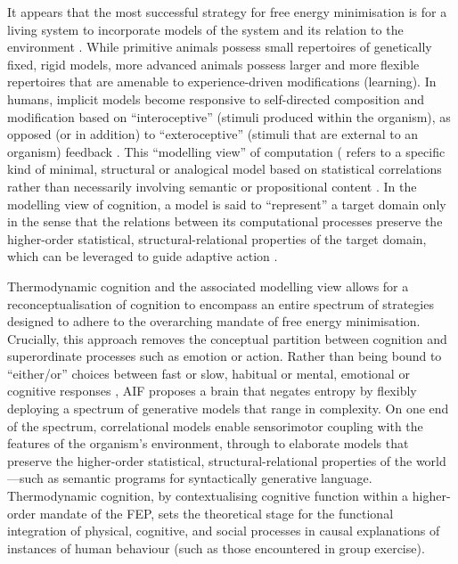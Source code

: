\begin{CJK}{UTF8}{gbsn}
It appears that the most successful strategy for free energy minimisation is for a living system to incorporate models of the system and its relation to the environment \citep{Conant1970}.  While primitive animals possess small repertoires of genetically fixed, rigid models, more advanced animals possess larger and more flexible repertoires that are amenable to experience-driven modifications (learning).  In humans, implicit models become responsive to self-directed composition and modification based on ``interoceptive'' (stimuli produced within the organism), as opposed (or in addition) to ``exteroceptive'' (stimuli that are external to an organism) feedback \citep{Yufik1998,FeldmanBarrett2015}.  This ``modelling view'' of computation (\citep{Grush 2001;Chirimuuta2014} refers to a specific kind of minimal, structural or analogical model based on statistical correlations rather than necessarily involving semantic or propositional content \citep[also known as ``generative models''][]{OBrien2004,Huto2015,Ramstead2016}.  In the modelling view of cognition, a model is said to ``represent'' a target domain only in the sense that the relations between its computational processes preserve the higher-order statistical, structural-relational properties of the target domain, which can be leveraged to guide adaptive action \citep[see][8]{Ramstead2016}.

Thermodynamic cognition and the associated modelling view allows for a reconceptualisation of cognition to encompass an entire spectrum of strategies designed to adhere to the overarching mandate of free energy minimisation. Crucially, this approach removes the conceptual partition between cognition and superordinate processes such as emotion or action.  Rather than being bound to ``either/or'' choices between fast or slow, habitual or mental, emotional or cognitive responses \citep[cf.][]{Kahneman2011}, AIF proposes a brain that negates entropy by flexibly deploying a spectrum of generative models that range in complexity. On one end of the spectrum, correlational models enable sensorimotor coupling with the features of the organism's environment, through to elaborate models that preserve the higher-order statistical, structural-relational properties of the world---such as semantic programs for syntactically generative language.  Thermodynamic cognition, by contextualising cognitive function within a higher-order mandate of the FEP, sets the theoretical stage for the functional integration of physical, cognitive, and social processes in causal explanations of instances of human behaviour (such as those encountered in group exercise).


\end{CJK}
